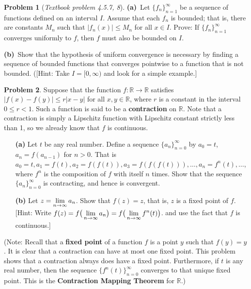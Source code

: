 \documentclass[12pt]{article}
\newcommand{\R}{{\mathbb R}}
\theoremstyle{definition}
\newtheorem{problem}{Problem}
\newenvironment{answer}{\par\medskip\bgroup\color{darkblue}}{\egroup\par\medskip}
\begin{document}
\begin{problem} %
[\it Textbook problem 4.5.7, 8]
\textbf{(a)}\ Let $\{f_n\}_{n=1}^\infty$
be a sequence of functions defined on an interval $I$. Assume that each $f_n$ is bounded; that is,
there are constants $M_n$ such that $|f_n(x)|\le M_n$ for all $x\in I$. Prove: If 
$\{f_n\}_{n=1}^\infty$ converges uniformly to $f$, then $f$ must also be bounded on $I$.

\textbf{(b)}\ Show that the hypothesis of uniform convergence is necessary
by finding a sequence of bounded functions that converges pointwise to a function that
is not bounded.  ([Hint: Take $I=[0,\infty)$ and look for a simple example.]
\end{problem}

\begin{answer}
\end{answer}



\begin{problem} %
Suppose that the function $f:\R\to\R$ satisfies $|f(x)-f(y)|\le r|x-y|$ for all $x,y\in\R$,
where $r$ is a constant in the interval $0\le r<1$.  Such a function is said to be a 
\textbf{contraction} on $\R$.  Note that a contraction is simply a Lipschitz function with
Lipschitz constant strictly less than 1, so we already know that $f$ is continuous.
\begin{itemize}
\item[\bf(a)]
   Let $t$ be any real number.  Define a sequence $\{a_n\}_{n=0}^\infty$ by 
   $a_0 = t$, $a_n = f(a_{n-1})$ for $n>0$.   That is $a_0 = t, a_1 = f(t), a_2=f(f(t)), 
   a_3=f(f(f(t))), \dots, a_n = f^n(t),\dots$, where $f^n$ is the composition of
   $f$ with itself $n$ times.  Show that the sequence $\{a_n\}_{n=0}^\infty$ is contracting,
   and hence is convergent.
\item[\bf(b)]
   Let $z = \displaystyle\lim_{n\to\infty} a_n$.  Show that $f(z) = z$, that is, $z$ is a fixed point of $f$.
   [Hint: Write $f(z)=f\big(\displaystyle\lim_{n\to\infty}a_n\big)=f\big(\lim_{n\to\infty}f^n(t)\big)$. and
   use the fact that $f$ is continuous.]
\end{itemize}
(Note: Recall that a \textbf{fixed point} of a function $f$ is a point $y$ such that $f(y) = y$.
It is clear that a contraction can have at most one fixed point.  This problem shows that
a contraction always does have a fixed point.  Furthermore, if $t$ is any real number, then
the sequence $\{f^n(t)\}_{n=0}^\infty$ converges to that unique fixed point.  This is the
\textbf{Contraction Mapping Theorem} for $\R$.)
\end{problem}
\end{document}
